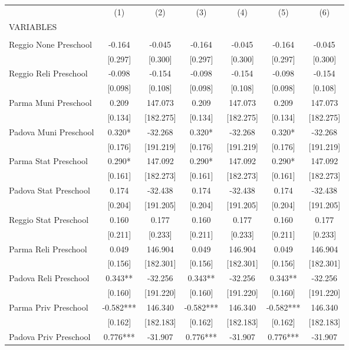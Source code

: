 \begin{tabular}{lcccccc} \hline
 & (1) & (2) & (3) & (4) & (5) & (6) \\
VARIABLES &  &  &  &  &  &  \\ \hline
 &  &  &  &  &  &  \\
Reggio None Preschool & -0.164 & -0.045 & -0.164 & -0.045 & -0.164 & -0.045 \\
 & [0.297] & [0.300] & [0.297] & [0.300] & [0.297] & [0.300] \\
Reggio Reli Preschool & -0.098 & -0.154 & -0.098 & -0.154 & -0.098 & -0.154 \\
 & [0.098] & [0.108] & [0.098] & [0.108] & [0.098] & [0.108] \\
Parma Muni Preschool & 0.209 & 147.073 & 0.209 & 147.073 & 0.209 & 147.073 \\
 & [0.134] & [182.275] & [0.134] & [182.275] & [0.134] & [182.275] \\
Padova Muni Preschool & 0.320* & -32.268 & 0.320* & -32.268 & 0.320* & -32.268 \\
 & [0.176] & [191.219] & [0.176] & [191.219] & [0.176] & [191.219] \\
Parma Stat Preschool & 0.290* & 147.092 & 0.290* & 147.092 & 0.290* & 147.092 \\
 & [0.161] & [182.273] & [0.161] & [182.273] & [0.161] & [182.273] \\
Padova Stat Preschool & 0.174 & -32.438 & 0.174 & -32.438 & 0.174 & -32.438 \\
 & [0.204] & [191.205] & [0.204] & [191.205] & [0.204] & [191.205] \\
Reggio Stat Preschool & 0.160 & 0.177 & 0.160 & 0.177 & 0.160 & 0.177 \\
 & [0.211] & [0.233] & [0.211] & [0.233] & [0.211] & [0.233] \\
Parma Reli Preschool & 0.049 & 146.904 & 0.049 & 146.904 & 0.049 & 146.904 \\
 & [0.156] & [182.301] & [0.156] & [182.301] & [0.156] & [182.301] \\
Padova Reli Preschool & 0.343** & -32.256 & 0.343** & -32.256 & 0.343** & -32.256 \\
 & [0.160] & [191.220] & [0.160] & [191.220] & [0.160] & [191.220] \\
Parma Priv Preschool & -0.582*** & 146.340 & -0.582*** & 146.340 & -0.582*** & 146.340 \\
 & [0.162] & [182.183] & [0.162] & [182.183] & [0.162] & [182.183] \\
Padova Priv Preschool & 0.776*** & -31.907 & 0.776*** & -31.907 & 0.776*** & -31.907 \\

\end{tabular}
